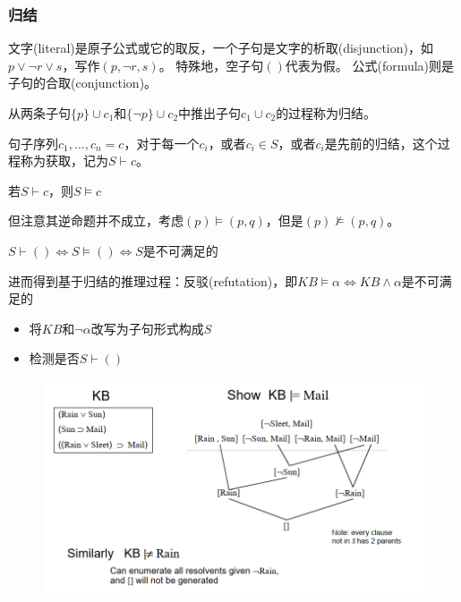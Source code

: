 \subsubsection{归结}
\begin{definition}[子句(clause)]
文字(literal)是原子公式或它的取反，一个子句是文字的析取(disjunction)，如$p\lor\lnot r\lor s$，写作$(p,\lnot r,s)$。
特殊地，空子句$()$代表为假。
公式(formula)则是子句的合取(conjunction)。
\end{definition}

\begin{definition}[归结(resolution)]
从两条子句$\{p\}\cup c_1$和$\{\lnot p\}\cup c_2$中推出子句$c_1\cup c_2$的过程称为归结。
\end{definition}
\begin{definition}[获取(derivation)]
句子序列$c_1,\ldots,c_n=c$，对于每一个$c_i$，或者$c_i\in S$，或者$c_i$是先前的归结，这个过程称为获取，记为$S\vdash c$。
\end{definition}
\begin{theorem}
若$S\vdash c$，则$S\models c$
\end{theorem}
但注意其逆命题并不成立，考虑$(p)\models(p,q)$，但是$(p)\nvDash(p,q)$。

\begin{theorem}
$S\vdash()\iff S\models()\iff S$是不可满足的
\end{theorem}

进而得到基于归结的推理过程：反驳(refutation)，即$KB\models\alpha\iff KB\land\alpha$是不可满足的
\begin{itemize}
	\item 将$KB$和$\lnot\alpha$改写为子句形式构成$S$
	\item 检测是否$S\vdash()$
\end{itemize}
\begin{figure}[H]
\centering
\includegraphics[width=0.8\linewidth]{fig/refutation.png}
\end{figure}


